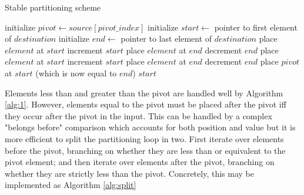 \documentclass{juliacon}
\begin{document}
\begin{algorithm}[h]
\caption{Stable partitioning scheme}\label{alg:split}
\begin{algorithmic}[1]
    \State initialize $pivot \leftarrow source[pivot\_index]$
    \State initialize $start \leftarrow$ pointer to first element of $destination$
    \State initialize $end \leftarrow$ pointer to  last element of $destination$
        \State place $element$ at $start$
        \State increment $start$
      \Else
        \State place $element$ at $end$
        \State decrement $end$
      \EndIf
    \EndFor
        \State place $element$ at $start$
        \State increment $start$
      \Else
        \State place $element$ at $end$
        \State decrement $end$
      \EndIf
    \EndFor
    \State place $pivot$ at $start$ (which is now equal to $end$)
    \State \Return $start$
  \EndProcedure
\end{algorithmic}
\end{algorithm}

Elements less than and greater than the pivot are handled well by Algorithm \ref{alg:1}. However, elements equal to the pivot must be placed after the pivot iff they occur after the pivot in the input. This can be handled by a complex "belongs before" comparison which accounts for both position and value but it is more efficient to split the partitioning loop in two. First iterate over elements before the pivot, branching on whether they are less than or equivalent to the pivot element; and then iterate over elements after the pivot, branching on whether they are strictly less than the pivot. Concretely, this may be implemented as Algorithm \ref{alg:split}


\end{document}
